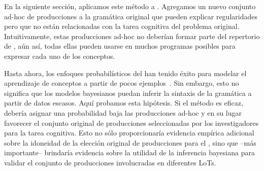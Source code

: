 
En la siguiente sección, aplicamos este método a \gramgeo. Agregamos un nuevo conjunto ad-hoc de producciones a la gramática original que pueden explicar regularidades pero que no están relacionadas con la tarea cognitiva del problema original. Intuitivamente, estas producciones ad-hoc no deberían formar parte del repertorio de \gramgeo, aún así, todas ellas pueden usarse en muchos programas posibles para expresar cada uno de los conceptos.


Hasta ahora, los enfoques probabilísticos del \lot han tenido éxito para modelar el aprendizaje de conceptos a partir de pocos ejemplos~\cite{tenenbaum2011grow,piantadosi2016four}. Sin embargo, esto no significa que los modelos bayesianos puedan inferir la sintaxis de la gramática a partir de datos escasos. Aquí probamos esta hipótesis. Si el método es eficaz, debería asignar una probabilidad baja las producciones ad-hoc y en su lugar favorecer el conjunto original de producciones seleccionadas por los investigadores para la tarea cognitiva. Esto no sólo proporcionaría evidencia empírica adicional sobre la idoneidad de la elección original de producciones para el \lot, sino que --más importante-- brindaría evidencia sobre la utilidad de la inferencia bayesiana para validar el conjunto de producciones involucradas en diferentes LoTs. 

